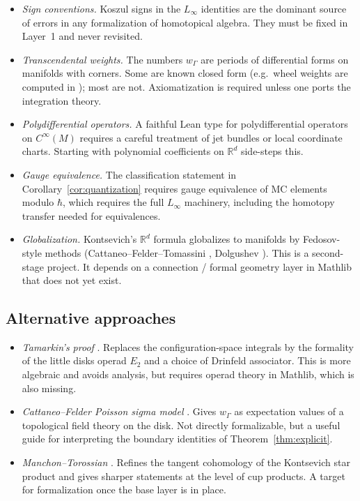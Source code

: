 \documentclass[11pt,a4paper]{article}
\theoremstyle{definition}
\newcommand{\R}{\mathbb{R}}
\newcommand{\Cinfty}{C^{\infty}}
\newcommand{\defi}[1]{\emph{#1}}
\begin{document}
\begin{itemize}[leftmargin=2em]
  \item \defi{Sign conventions.} Koszul signs in the $L_\infty$
        identities are the dominant source of errors in any
        formalization of homotopical algebra. They must be fixed in
        Layer~1 and never revisited.
  \item \defi{Transcendental weights.} The numbers $w_{\Gamma}$ are
        periods of differential forms on manifolds with corners. Some
        are known closed form (e.g.\ wheel weights are computed in
        \cite{Shoikhet2001}); most are not. Axiomatization is required
        unless one ports the integration theory.
  \item \defi{Polydifferential operators.} A faithful Lean type for
        polydifferential operators on $\Cinfty(M)$ requires a careful
        treatment of jet bundles or local coordinate charts. Starting
        with polynomial coefficients on $\R^{d}$ side-steps this.
  \item \defi{Gauge equivalence.} The classification statement in
        Corollary~\ref{cor:quantization} requires gauge equivalence of
        MC elements modulo $\hbar$, which requires the full $L_\infty$
        machinery, including the homotopy transfer needed for
        equivalences.
  \item \defi{Globalization.} Kontsevich's $\R^{d}$ formula globalizes
        to manifolds by Fedosov-style methods
        (Cattaneo--Felder--Tomassini \cite{CFT}, Dolgushev
        \cite{Dolgushev2005}). This is a second-stage project. It
        depends on a connection / formal geometry layer in Mathlib
        that does not yet exist.
\end{itemize}

\subsection{Alternative approaches}\label{ssec:alternatives}

\begin{itemize}[leftmargin=2em]
  \item \defi{Tamarkin's proof} \cite{Tamarkin}. Replaces the
        configuration-space integrals by the formality of the little
        disks operad $E_{2}$ and a choice of Drinfeld associator. This
        is more algebraic and avoids analysis, but requires operad
        theory in Mathlib, which is also missing.
  \item \defi{Cattaneo--Felder Poisson sigma model} \cite{CF}. Gives
        $w_{\Gamma}$ as expectation values of a topological field
        theory on the disk. Not directly formalizable, but a useful
        guide for interpreting the boundary identities of
        Theorem~\ref{thm:explicit}.
  \item \defi{Manchon--Torossian} \cite{MT}. Refines the tangent
        cohomology of the Kontsevich star product and gives sharper
        statements at the level of cup products. A target for
        formalization once the base layer is in place.
\end{itemize}
\end{document}
